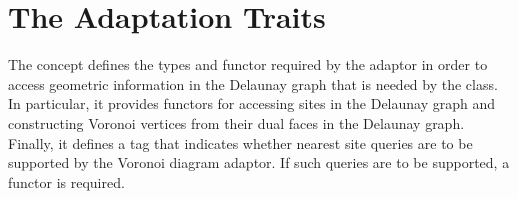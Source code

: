 


\section{The Adaptation Traits\label{sec:vda2-traits}}

The  concept defines the types and
functor required by the adaptor in order to access geometric
information in the Delaunay graph that is needed by the
 class.
In particular, it provides functors for accessing sites in the Delaunay
graph and constructing Voronoi vertices from their dual faces in the
Delaunay graph.
Finally, it defines a tag that indicates whether nearest site queries
are to be supported by the Voronoi diagram adaptor. If such queries
are to be supported, a functor is required.

